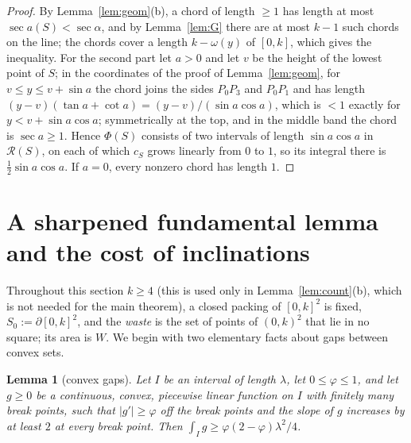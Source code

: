 \documentclass[11pt]{amsart}
\newtheorem{lemma}[theorem]{Lemma}
\theoremstyle{definition}
\theoremstyle{remark}
\begin{document}
\begin{proof}
By Lemma~\ref{lem:geom}(b), a chord of length $\ge1$ has length at most $\sec a(S)<\sec\alpha$, and by Lemma~\ref{lem:G} there are
at most $k-1$ such chords on the line; the chords cover a length $k-\omega(y)$ of $[0,k]$, which gives the inequality.
For the second part let $a>0$ and let $v$ be the height of the lowest point of $S$; in the coordinates of the proof of
Lemma~\ref{lem:geom}, for $v\le y\le v+\sin a$ the chord joins
the sides $P_0P_3$ and $P_0P_1$ and has length $(y-v)(\tan a+\cot a)=(y-v)/(\sin a\cos a)$, which is $<1$ exactly for
$y<v+\sin a\cos a$; symmetrically at the top, and in the middle band the chord is $\sec a\ge1$. Hence $\Phi(S)$ consists of two
intervals of length $\sin a\cos a$ in $\mathcal R(S)$, on each of which $c_S$ grows linearly from $0$ to $1$, so its integral
there is $\frac12\sin a\cos a$. If $a=0$, every nonzero chord has length $1$.
\end{proof}

\section{A sharpened fundamental lemma and the cost of inclinations}

Throughout this section $k\ge4$ (this is used only in Lemma~\ref{lem:count}(b), which is not needed for the main theorem), a closed packing of $[0,k]^2$ is fixed, $S_0:=\partial[0,k]^2$, and the \emph{waste} is the set of
points of $(0,k)^2$ that lie in no square; its area is $W$. We begin with two elementary facts about gaps between convex sets.

\begin{lemma}[convex gaps]\label{lem:cg}
Let $I$ be an interval of length $\lambda$, let $0\le\varphi\le1$, and let $g\ge0$ be a continuous, convex, piecewise linear
function on $I$ with finitely many break points, such that $|g'|\ge\varphi$ off the break points and the slope of $g$
increases by at least $2$ at every break point. Then $\int_Ig\ge\varphi(2-\varphi)\lambda^2/4$.
\end{lemma}
\end{document}
